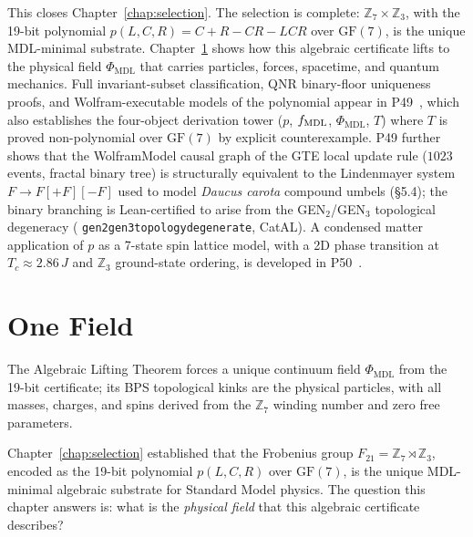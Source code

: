 \documentclass[11pt,openany]{book}
\theoremstyle{remark}
\newcommand{\PHIMDL}{\Phi_{\mathrm{MDL}}}
\newcommand{\lean}[1]{%
  \penalty-100
  \begingroup\def\_{\textunderscore\allowbreak}\texttt{#1}\endgroup}
\newcommand{\CMCA}{\text{CMCA}}
\newcommand{\poly}{p(L,C,R)}
\begin{document}
\noindent
This closes Chapter~\ref{chap:selection}. The selection is complete:
$\mathbb{Z}_7\times\mathbb{Z}_3$, with the 19-bit polynomial $\poly = C+R-CR-LCR$
over $\mathrm{GF}(7)$, is the unique MDL-minimal substrate. Chapter~\ref{chap:field}
shows how this algebraic certificate lifts to the physical field $\PHIMDL$ that
carries particles, forces, spacetime, and quantum mechanics.
Full invariant-subset classification, QNR binary-floor uniqueness proofs, and
Wolfram-executable models of the polynomial appear in P49~\cite{SpivackGTEPolynomialWolfram},
which also establishes the four-object derivation tower ($p$, $f_{\rm MDL}$, $\PHIMDL$, $T$)
where $T$ is proved non-polynomial over $\mathrm{GF}(7)$ by explicit counterexample.
P49 further shows that the WolframModel causal graph of the GTE local update rule
($1023$ events, fractal binary tree) is structurally equivalent to the Lindenmayer
system $F\to F[{+}F][{-}F]$ used to model \emph{Daucus carota} compound umbels
(§5.4); the binary branching is Lean-certified to arise from the GEN$_2$/GEN$_3$
topological degeneracy (\lean{gen2\_gen3\_topology\_degenerate}, CatAL).
A condensed matter application of $p$ as a 7-state spin lattice model, with a 2D phase
transition at $T_c \approx 2.86\,J$ and $\mathbb{Z}_3$ ground-state ordering, is developed
in P50~\cite{SpivackSpin7Lattice}.

\chapter{One Field}
\label{chap:field}

\begin{tcolorbox}[colback=blue!5,colframe=blue!50!black,title={Chapter~5 Claim}]
The Algebraic Lifting Theorem forces a unique continuum field $\PHIMDL$ from the
19-bit \CMCA{} certificate; its BPS topological kinks are the physical particles, with
all masses, charges, and spins derived from the $\mathbb{Z}_7$ winding number
and zero free parameters.
\end{tcolorbox}

Chapter~\ref{chap:selection} established that the Frobenius group
$F_{21} = \mathbb{Z}_7\rtimes\mathbb{Z}_3$,
encoded as the 19-bit polynomial $\poly$ over $\mathrm{GF}(7)$, is the unique
MDL-minimal algebraic substrate for Standard Model physics.
The question this chapter answers is: what is the \emph{physical field} that
this algebraic certificate describes?
\end{document}
